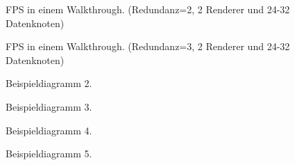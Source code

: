 \begin{figure}
\centering

  \caption{FPS in einem Walkthrough. (Redundanz=2, 2 Renderer und 24-32 Datenknoten)}
  \label{fig:eval:diag1}
\end{figure}

\begin{figure}
\centering

  \caption{FPS in einem Walkthrough. (Redundanz=3, 2 Renderer und 24-32 Datenknoten)}
  \label{fig:eval:diag1}
\end{figure}

\begin{figure}
\centering

  \caption{Beispieldiagramm 2.}
  \label{fig:eval:diag2}
\end{figure}

\begin{figure}
\centering

  \caption{Beispieldiagramm 3.}
  \label{fig:eval:diag3}
\end{figure}

\begin{figure}
\centering

  \caption{Beispieldiagramm 4.}
  \label{fig:eval:diag4}
\end{figure}

\begin{figure}
  \centering
  
  \caption{Beispieldiagramm 5. }
  \label{fig:eval:diag5}
\end{figure}
